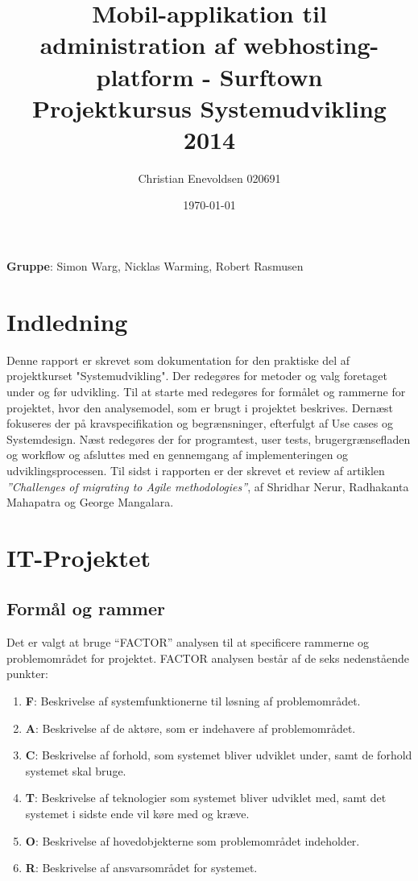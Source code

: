 \documentclass[12pt]{article}
\title{Mobil-applikation til administration af webhosting-platform - Surftown\\Projektkursus Systemudvikling 2014}
\date{\today}
\author{Christian Enevoldsen 020691}
\begin{document}
\maketitle
\begin{center}
  \textbf{Gruppe}: Simon Warg, Nicklas Warming, Robert Rasmusen\\
\end{center}
\newpage
\tableofcontents
\newpage
\section*{Indledning}

Denne rapport er skrevet som dokumentation for den praktiske del af projektkurset "Systemudvikling". Der redegøres for metoder og valg foretaget under og før udvikling. Til at starte med redegøres for formålet og rammerne for projektet, hvor den analysemodel, som er brugt i projektet beskrives. Dernæst fokuseres der på kravspecifikation og begrænsninger, efterfulgt af Use cases og Systemdesign. Næst redegøres der for programtest, user tests, brugergrænsefladen og workflow og afsluttes med en gennemgang af implementeringen og udviklingsprocessen. Til sidst i rapporten er der skrevet et review af artiklen \emph{''Challenges of migrating to Agile methodologies''}, af Shridhar Nerur, Radhakanta Mahapatra og George Mangalara. 

\section {IT-Projektet}

\subsection{Formål og rammer}

Det er valgt at bruge ``FACTOR'' \cite{factor} analysen til at specificere rammerne og problemområdet for projektet.
FACTOR analysen består af de seks nedenstående punkter:
\begin{enumerate}
	\item{\textbf{F}: Beskrivelse af systemfunktionerne til løsning af problemområdet.}	
	\item{\textbf{A}: Beskrivelse af de aktøre, som er indehavere af problemområdet.}
	\item{\textbf{C}: Beskrivelse af forhold, som systemet bliver udviklet under, samt de forhold systemet skal bruge. }
	\item{\textbf{T}: Beskrivelse af teknologier som systemet bliver udviklet med, samt det systemet i sidste ende vil køre med og kræve.}
	\item{\textbf{O}: Beskrivelse af hovedobjekterne som problemområdet indeholder.}
	\item{\textbf{R}: Beskrivelse af ansvarsområdet for systemet.}

\end{enumerate}
\end{document}
